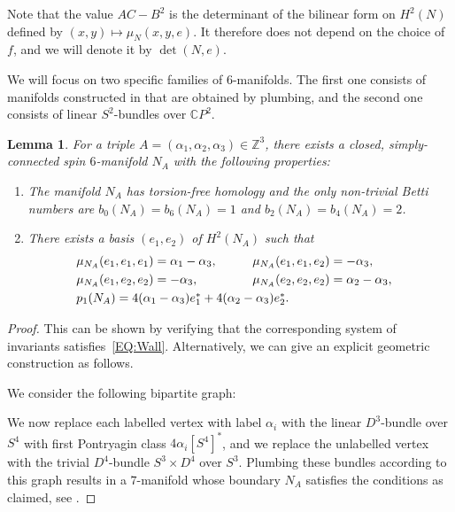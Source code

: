 \documentclass[pdftex]{sigma}
\numberwithin{equation}{section}
\newtheorem{Lemma}[Theorem]{Lemma}
\theoremstyle{definition}
\numberwithin{table}{section}
\newcommand{\Z}{\mathbb{Z}}
\newcommand{\C}{\mathbb{C}}
\begin{document}
Note that the value $AC-B^2$ is the determinant of the bilinear form on $H^2(N)$ defined by $(x,y)\mapsto \mu_N(x,y,e)$. It therefore does not depend on the choice of $f$, and we will denote it by $\det(N,e)$.

We will focus on two specific families of $6$-manifolds. The first one consists of manifolds constructed in \cite{Re24b} that are obtained by plumbing, and the second one consists of linear $S^2$-bundles over $\C P^2$.

\begin{Lemma}\label{L:N_A}
	For a triple $A=(\alpha_1,\alpha_2,\alpha_3)\in\Z^3$, there exists a closed, simply-connected spin $6$-manifold $N_A$ with the following properties:
	\begin{enumerate}\itemsep=0pt
		\item[$(1)$] The manifold $N_A$ has torsion-free homology and the only non-trivial Betti numbers are $b_0(N_A)=b_6(N_A)\allowbreak=1$ and $b_2(N_A)=b_4(N_A)=2$.
		\item[$(2)$] There exists a basis $(e_1,e_2)$ of $H^2(N_A)$ such that
		\begin{alignat*}{3}
			&\mu_{N_A}(e_1,e_1,e_1)=\alpha_1-\alpha_3,\qquad&&
			\mu_{N_A}(e_1,e_1,e_2)=-\alpha_3,&\\
			&\mu_{N_A}(e_1,e_2,e_2)=-\alpha_3,\qquad&&
			\mu_{N_A}(e_2,e_2,e_2)=\alpha_2-\alpha_3,&\\
			&\makebox[0pt][l]{$p_1(N_A)=4(\alpha_1-\alpha_3)e_1^*+4(\alpha_2-\alpha_3)e_2^*.$}&
		\end{alignat*}
	\end{enumerate}
\end{Lemma}
\begin{proof}
	This can be shown by verifying that the corresponding system of invariants satisfies~\eqref{EQ:Wall}. Alternatively, we can give an explicit geometric construction as follows.
	
	We consider the following bipartite graph:
	\begin{center}
	\end{center}
	We now replace each labelled vertex with label $\alpha_i$ with the linear $D^3$-bundle over $S^4$ with first Pontryagin class $4\alpha_i[S^4]^*$, and we replace the unlabelled vertex with the trivial $D^4$-bundle $S^3\times D^4$ over $S^3$. Plumbing these bundles according to this graph results in a $7$-manifold whose boundary $N_A$ satisfies the conditions as claimed, see \cite[Lemma~4.6 and Proposition 4.12]{Re24b}.
\end{proof}
\end{document}
